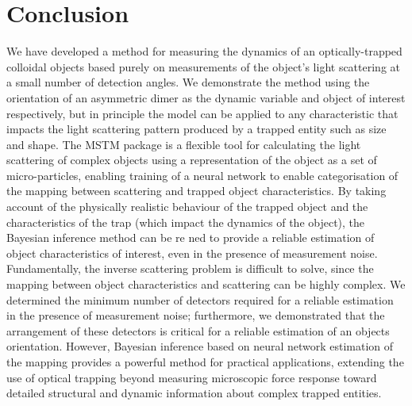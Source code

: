 \section{Conclusion}
\label{sec:Conclusion}

We have developed a method for measuring the dynamics of an 
optically-trapped colloidal objects based purely on 
measurements of the object's light scattering at a small 
number of detection angles. We demonstrate the method using 
the orientation of an asymmetric dimer as the dynamic variable 
and object of interest respectively, but in principle the 
model can be applied to any characteristic that impacts the 
light scattering pattern produced by a trapped entity such 
as size and shape. The MSTM package is a flexible tool for 
calculating the light scattering of complex objects using a 
representation of the object as a set of micro-particles, 
enabling training of a neural network to enable categorisation 
of the mapping between scattering and trapped object 
characteristics. By taking account of the physically realistic 
behaviour of the trapped object and the characteristics of 
the trap (which impact the dynamics of the object), the 
Bayesian inference method can be re ned to provide a reliable 
estimation of object characteristics of interest, even in the 
presence of measurement noise. Fundamentally, the inverse 
scattering problem is difficult to solve, since the mapping 
between object characteristics and scattering can be highly 
complex. We determined the minimum number of detectors 
required for a reliable estimation in the presence of 
measurement noise; furthermore, we demonstrated that the 
arrangement of these detectors is critical for a reliable 
estimation of an objects orientation. However, Bayesian 
inference based on neural network estimation of the mapping 
provides a powerful method for practical applications, 
extending the use of optical trapping beyond measuring 
microscopic force response toward detailed structural and 
dynamic information about complex trapped entities. 
